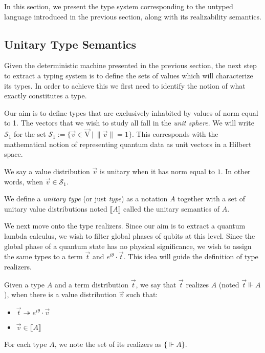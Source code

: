 \documentclass[runningheads,orivec,envcountsame,envcountsect]{llncs}
\newcommand\s[1]{\ensuremath{\mathsf{#1}}}
\newcommand\Val{{\s V}}
\def\Val{\mathrm{V}}          %
\def\Sph{\mathcal{S}_1}       %
\def\sem#1{\llbracket#1\rrbracket}
\def\real{\Vdash}
\begin{document}
In this section, we present the type system corresponding to the untyped language introduced in the previous section, along with its realizability semantics.

\subsection{Unitary Type Semantics}

Given the deterministic machine presented in the previous section, the next step to extract a typing system is to define the sets of values which will characterize its types. In order to achieve this we first need to identify the notion of what exactly constitutes a type.

Our aim is to define types that are exclusively inhabited by values of norm equal to 1. The vectors that we wish to study all fall in the \emph{unit sphere}. We will write $\Sph$ for the set $\Sph := \{\vec v \in \vec{\Val}~|~\|\vec v\| =1\}$. This corresponds with the mathematical notion of representing quantum data as unit vectors in a Hilbert space. 

\begin{definition}
  We say a value distribution $\vec{v}$ is unitary when it has norm equal to $1$. In other words, when $\vec{v}\in\Sph$.
\end{definition}

\begin{definition}
  We define a \textit{unitary type} (or just \textit{type}) as a notation $A$ together with a set of unitary value distributions noted $\sem{A}$ called the unitary semantics of $A$.
\end{definition}

We next move onto the type realizers. Since our aim is to extract a quantum lambda calculus, we wish to filter global phases of qubits at this level. Since the global phase of a quantum state has no physical significance, we wish to assign the same types to a term $\vec{t}$ and $e^{i\theta}\cdot\vec{t}$. This idea will guide the definition of type realizers.

\begin{definition}
  Given a type $A$ and a term distribution $\vec t$, we say that $\vec t$ realizes $A$ (noted $\vec t \real A$), when there is a value distribution $\vec v$ such that:
  \begin{itemize}
    \item $\vec{t}\twoheadrightarrow e^{i\theta}\cdot\vec{v}$
    \item $\vec{v}\in\sem{A}$
  \end{itemize}
  For each type $A$, we note the set of its realizers as $\{\real A\}$.
\end{definition}
\end{document}
